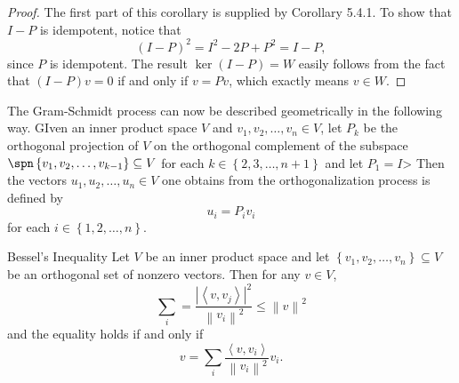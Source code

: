 \documentclass[linearalgebraII]{subfiles}
\begin{document}
    \begin{proof}
        The first part of this corollary is supplied by Corollary 5.4.1. To show that $I-P$ is idempotent, notice that
        \begin{equation*}
            \left( I-P \right) ^2 = I^2 - 2P + P^2 = I - P,
        \end{equation*}
        since $P$ is idempotent. The result $\ker(I-P) = W$ easily follows from the fact that $(I-P)v = 0$ if and only if $v=Pv$, which exactly means $v\in W$.
    \end{proof}

    \begin{remark}
        The Gram-Schmidt process can now be described geometrically in the following way. GIven an inner product space $V$ and $v_1,v_2,\ldots,v_n\in V$, let $P_k$ be the orthogonal projection of $V$ on the orthogonal complement of the subspace $\spn\left\lbrace v_1,v_2,\ldots,v_{k-1} \right\rbrace \subseteq V$ for each $k\in\left\lbrace 2,3,\ldots,n+1 \right\rbrace$ and let $P_1=I$> Then the vectors $u_1,u_2,\ldots,u_n\in V$ one obtains from the orthogonalization process is defined by
        \begin{equation*}
            u_i = P_iv_i
        \end{equation*}
        for each $i\in\left\lbrace 1,2,\ldots,n \right\rbrace$.
    \end{remark}

    \begin{cor}{Bessel's Inequality}
        Let $V$ be an inner product space and let $\left\lbrace v_1,v_2,\ldots,v_n \right\rbrace \subseteq V$ be an orthogonal set of nonzero vectors. Then for any $v\in V$,
        \begin{equation*}
            \sum^{}_{i} = \frac{\left| \left\langle v, v_j\right\rangle  \right| ^2}{\left\lVert v_i\right\rVert ^2}\leq \left\lVert v\right\rVert ^2 
        \end{equation*}
        and the equality holds if and only if
        \begin{equation*}
            v = \sum^{}_{i} \frac{\left\langle v, v_i\right\rangle }{\left\lVert v_i\right\rVert ^2}v_i.
        \end{equation*}
    \end{cor}	
\end{document}
